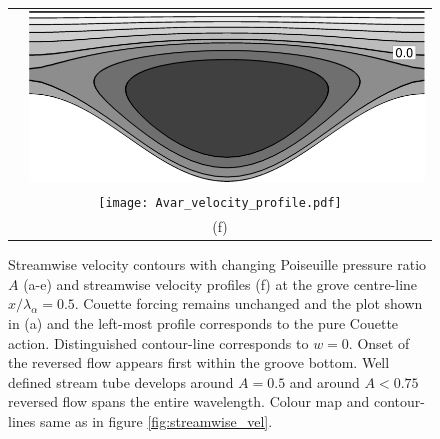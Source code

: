 \documentclass[lineno]{jfm}
\begin{document}
\begin{figure}
\begin{tabular}{cc}
    &
    \includegraphics[width=\wgh]{a100.png} \\
    \multicolumn{2}{c}{\texttt{[image: Avar\_velocity\_profile.pdf]}} \\
    \multicolumn{2}{c}{(f)} \\
\end{tabular}
%  
\caption{Streamwise velocity contours with changing Poiseuille pressure ratio $A$ (a-e) and streamwise velocity profiles (f) at the grove centre-line $x/\lambda_\alpha=0.5$.
Couette forcing remains unchanged and the plot shown in (a) and the left-most profile corresponds to the pure Couette action.
Distinguished contour-line corresponds to $w=0$.
Onset of the reversed flow appears first within the groove bottom. Well defined stream tube develops around $A=0.5$ and around $A<0.75$ reversed flow spans the entire wavelength.
Colour map and contour-lines same as in figure \ref{fig:streamwise_vel}.
}
 \label{fig:streamwise_prof_A}
\end{figure}

\end{document}
